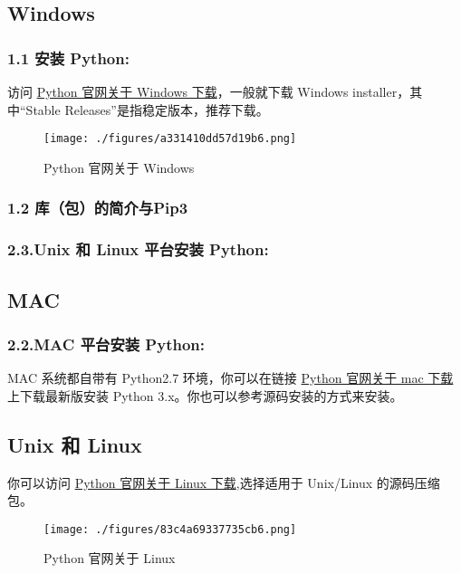
\subsection{Windows} 

\subsubsection{1.1 安装 Python:}
访问 \href{https://www.python.org/downloads/windows/}{Python 官网关于 Windows 下载}，一般就下载  Windows installer，其中“Stable Releases”是指稳定版本，推荐下载。
\begin{figure}[ht]
\centering
\texttt{[image: ./figures/a331410dd57d19b6.png]}
\caption{Python 官网关于 Windows} \label{fig_Python_1}
\end{figure}
\subsubsection{1.2 库（包）的简介与Pip3}


\subsubsection{2.3.Unix 和 Linux 平台安装 Python:}

\subsection{MAC}

\subsubsection{2.2.MAC 平台安装 Python:}
MAC 系统都自带有 Python2.7 环境，你可以在链接 \href{https://www.python.org/downloads/mac-osx/}{Python 官网关于 mac 下载} 上下载最新版安装 Python 3.x。你也可以参考源码安装的方式来安装。

\subsection{Unix 和 Linux} 

你可以访问 \href{https://www.python.org/downloads/source/}{Python 官网关于 Linux 下载},选择适用于 Unix/Linux 的源码压缩包。
\begin{figure}[ht]
\centering
\texttt{[image: ./figures/83c4a69337735cb6.png]}
\caption{Python 官网关于 Linux} \label{fig_Python_2}
\end{figure}

